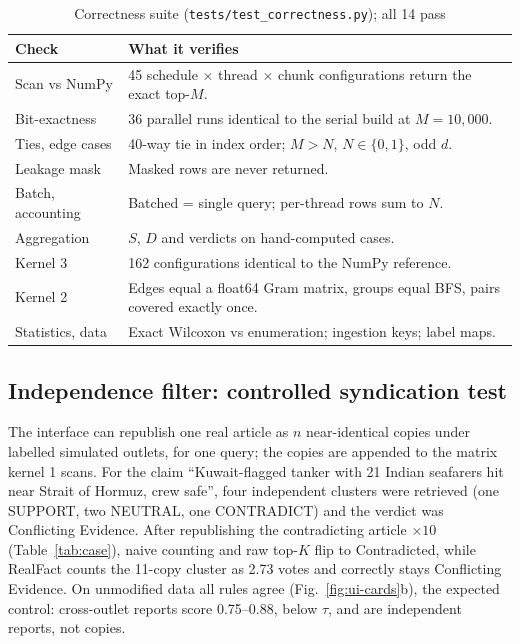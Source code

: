 \documentclass[conference,a4paper]{IEEEtran}
\begin{document}
\begin{table}[!t]
\caption{Correctness suite (\texttt{tests/test\_correctness.py}); all 14 pass}
\label{tab:tests}
\centering\footnotesize
\setlength{\tabcolsep}{3pt}
\begin{tabularx}{\columnwidth}{P{2.35cm}Y}
\toprule
\textbf{Check} & \textbf{What it verifies}\\
\midrule
Scan vs NumPy & 45 schedule $\times$ thread $\times$ chunk configurations return the exact top-$M$.\\
Bit-exactness & 36 parallel runs identical to the serial build at $M=10{,}000$.\\
Ties, edge cases & 40-way tie in index order; $M>N$, $N\in\{0,1\}$, odd $d$.\\
Leakage mask & Masked rows are never returned.\\
Batch, accounting & Batched = single query; per-thread rows sum to $N$.\\
Aggregation & $S$, $D$ and verdicts on hand-computed cases.\\
Kernel 3 & 162 configurations identical to the NumPy reference.\\
Kernel 2 & Edges equal a float64 Gram matrix, groups equal BFS, pairs covered exactly once.\\
Statistics, data & Exact Wilcoxon vs enumeration; ingestion keys; label maps.\\
\bottomrule
\end{tabularx}
\end{table}

\subsection{Independence filter: controlled syndication test}
The interface can republish one real article as $n$ near-identical copies under labelled simulated outlets, for one
query; the copies are appended to the matrix kernel 1 scans. For the claim ``Kuwait-flagged tanker with 21 Indian
seafarers hit near Strait of Hormuz, crew safe'', four independent clusters were retrieved (one SUPPORT, two NEUTRAL,
one CONTRADICT) and the verdict was Conflicting Evidence. After republishing the contradicting article $\times10$
(Table~\ref{tab:case}), naive counting and raw top-$K$ flip to Contradicted, while RealFact counts the 11-copy cluster
as 2.73 votes and correctly stays Conflicting Evidence. On unmodified data all rules agree
(Fig.~\ref{fig:ui-cards}b), the expected control: cross-outlet reports score 0.75--0.88, below $\tau$, and are
independent reports, not copies.
\end{document}
